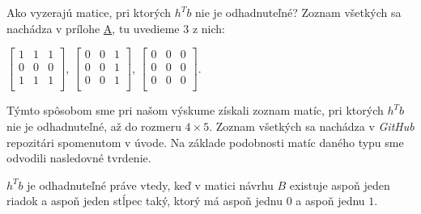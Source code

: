 Ako vyzerajú matice, pri ktorých $h^T b$ nie je odhadnuteľné? Zoznam všetkých sa nachádza v prílohe \hyperref[appendix:a]{A}, tu uvedieme $3$ z nich:

\begin{center}
$
\begin{bmatrix}
1 & 1 & 1 \\
0 & 0 & 0 \\
1 & 1 & 1 \\
\end{bmatrix}
$, 
$
\begin{bmatrix}
0 & 0 & 1 \\
0 & 0 & 1 \\
0 & 0 & 1 \\
\end{bmatrix}
$, 
$
\begin{bmatrix}
0 & 0 & 0 \\
0 & 0 & 0 \\
0 & 0 & 0 \\
\end{bmatrix}
$.
\end{center}

Týmto spôsobom sme pri našom výskume získali zoznam matíc, pri ktorých $h^T b$ nie je odhadnuteľné, až do rozmeru $4 \times 5$.
Zoznam všetkých sa nachádza v \emph{GitHub} repozitári spomenutom v úvode. 
Na základe podobnosti matíc daného typu sme odvodili nasledovné tvrdenie.

\begin{prop}
\label{statement 1}
$h^T b$ je odhadnuteľné práve vtedy, keď v matici návrhu $B$ existuje aspoň jeden riadok a aspoň jeden stĺpec taký,
ktorý má aspoň jednu $0$ a aspoň jednu $1$.
\end{prop}


